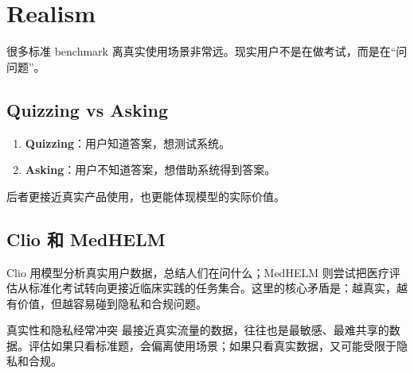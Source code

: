 \section{Realism}

很多标准 benchmark 离真实使用场景非常远。现实用户不是在做考试，而是在“问问题”。

\subsection{Quizzing vs Asking}

\begin{enumerate}
    \item \textbf{Quizzing}：用户知道答案，想测试系统。
    \item \textbf{Asking}：用户不知道答案，想借助系统得到答案。
\end{enumerate}

后者更接近真实产品使用，也更能体现模型的实际价值。

\subsection{Clio 和 MedHELM}

Clio 用模型分析真实用户数据，总结人们在问什么；MedHELM 则尝试把医疗评估从标准化考试转向更接近临床实践的任务集合。这里的核心矛盾是：越真实，越有价值，但越容易碰到隐私和合规问题。

\begin{importantbox}{真实性和隐私经常冲突}
最接近真实流量的数据，往往也是最敏感、最难共享的数据。评估如果只看标准题，会偏离使用场景；如果只看真实数据，又可能受限于隐私和合规。
\end{importantbox}


